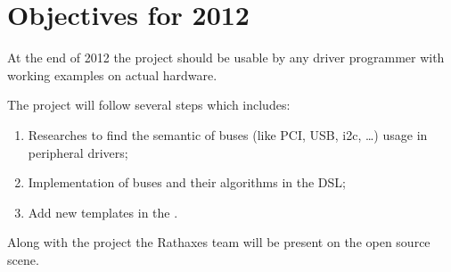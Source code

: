 \section{Objectives for 2012}

At the end of 2012 the project should be usable by any driver programmer with
working examples on actual hardware.

The project will follow several steps which includes:
\begin{enumerate}
\item Researches to find the semantic of buses (like PCI, USB, i2c, \ldots)
usage in peripheral drivers;
\item Implementation of buses and their algorithms in the DSL;
\item Add new templates in the \BL.
\end{enumerate}

Along with the project the Rathaxes team will be present on the open source
scene.

